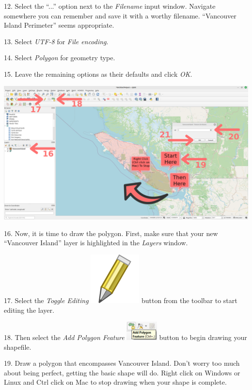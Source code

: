 \documentclass[oneside,a4paper,11pt,explicit]{book}
\begin{document}
	12. Select the ``...'' option next to the \textit{Filename} input window. Navigate somewhere you can remember and save it with a worthy filename. ``Vancouver Island Perimeter'' seems appropriate.
	
	13. Select \textit{UTF-8} for \textit{File encoding}.
	
	14. Select \textit{Polygon} for geometry type. 
	
	15. Leave the remaining options as their defaults and click \textit{OK}.
	
	\centerline{\includegraphics[width=\textwidth]{DrawPolygon.png}}
	
	16. Now, it is time to draw the polygon. First, make sure that your new ``Vancouver Island'' layer is highlighted in the \textit{Layers} window. 
	
	17. Select the \textit{Toggle Editing} \includegraphics[height=\fontcharht\font`\B]{mActionToggleEditing.png} button from the toolbar to start editing the layer. 
	
	18. Then select the \textit{Add Polygon Feature} \includegraphics[height=10mm]{addpolygon.png} button to begin drawing your shapefile. 
	
	19. Draw a polygon that encompasses Vancouver Island. Don't worry too much about being perfect, getting the basic shape will do. Right click on Windows or Linux and Ctrl click on Mac to stop drawing when your shape is complete.
	
\end{document}

